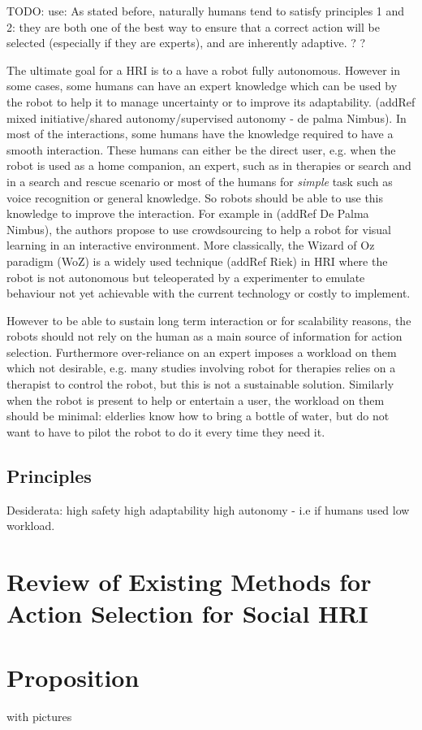 	TODO: use: As stated before, naturally humans tend to satisfy principles 1 and 2: they are both one of the best way to ensure that a correct action will be selected (especially if they are experts), and are inherently adaptive. ? ?
	

	
	The ultimate goal for a HRI is to a have a robot fully autonomous. However in some cases, some humans can have an expert knowledge which can be used by the robot to help it to manage uncertainty or to improve its adaptability. (addRef mixed initiative/shared autonomy/supervised autonomy - de palma Nimbus).				
	In most of the interactions, some humans have the knowledge required to have a smooth interaction. These humans can either be the direct user, e.g. when the robot is used as a home companion, an expert, such as in therapies or search and in a search and rescue scenario or most of the humans for \emph{simple} task such as voice recognition or general knowledge. So robots should be able to use this knowledge to improve the interaction. For example in (addRef De Palma Nimbus), the authors propose to use crowdsourcing to help a robot for visual learning in an interactive environment. More classically, the Wizard of Oz paradigm (WoZ) is a widely	 used technique (addRef Riek) in HRI where the robot is not autonomous but teleoperated by a experimenter to emulate behaviour not yet achievable with the current technology or costly to implement. 
	
	However to be able to sustain long term interaction or for scalability reasons, the robots should not rely on the human as a main source of information for action selection. Furthermore over-reliance on an expert imposes a workload on them which not desirable, e.g. many studies involving robot for therapies relies on a therapist to control the robot, but this is not a sustainable solution. Similarly when the robot is present to help or entertain a user, the workload on them should be minimal: elderlies know how to bring a bottle of water, but do not want to have to pilot the robot to do it every time they need it.
	
\subsection{Principles}


	Desiderata: 
	high safety
	high adaptability
	high autonomy - i.e if humans used low workload.	
		
		
\section{Review of Existing Methods for Action Selection for Social HRI}

\section{Proposition}


with pictures
